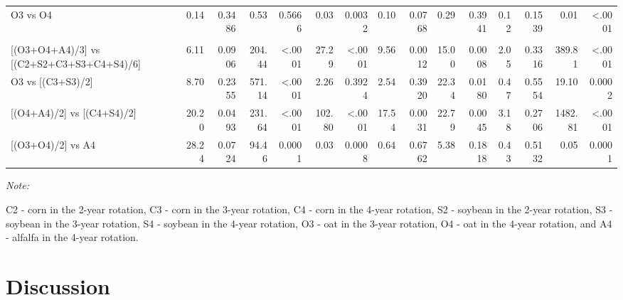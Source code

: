 \documentclass[
]{article}
\begin{document}
\begin{landscape}
\begin{table}
{\begin{threeparttable}
\begin{tabular}[t]{lr>{}r|r>{}r|r>{}r|r>{}r|r>{}r|r>{}r|rr}
\hspace{1em}\hspace{1em}O3 vs O4 & 0.14 & 0.3486 & 0.53 & 0.5666 & 0.03 & 0.0032 & 0.10 & 0.0768 & 0.29 & 0.3941 & 0.12 & 0.1539 & 0.01 & <.0001\\
\addlinespace[0.3em]
\multicolumn{15}{l}{\textbf{(B3) - Crop type effects}}\\
\hspace{1em}\hspace{1em}{}[(O3+O4+A4)/3] vs [(C2+S2+C3+S3+C4+S4)/6] & 6.11 & 0.0906 & 204.44 & <.0001 & 27.29 & <.0001 & 9.56 & 0.0012 & 15.00 & 0.0008 & 2.05 & 0.3316 & 389.81 & <.0001\\
\hspace{1em}\hspace{1em}O3 vs [(C3+S3)/2] & 8.70 & 0.2355 & 571.14 & <.0001 & 2.26 & 0.3924 & 2.54 & 0.3920 & 22.34 & 0.0180 & 0.47 & 0.5554 & 19.10 & 0.0002\\
\hspace{1em}\hspace{1em}{}[(O4+A4)/2] vs [(C4+S4)/2] & 20.20 & 0.0493 & 231.64 & <.0001 & 102.80 & <.0001 & 17.54 & 0.0031 & 22.79 & 0.0045 & 3.18 & 0.2706 & 1482.81 & <.0001\\
\hspace{1em}\hspace{1em}{}[(O3+O4)/2] vs A4 & 28.24 & 0.0724 & 94.46 & 0.0001 & 0.03 & 0.0008 & 0.64 & 0.6762 & 5.38 & 0.1818 & 0.43 & 0.5132 & 0.05 & 0.0001\\
\bottomrule
\end{tabular}
\begin{tablenotes}[para]
\item \textit{Note: } 
\item C2 - corn in the 2-year rotation, C3 - corn in the 3-year rotation, C4 - corn in the 4-year rotation, S2 - soybean in the 2-year rotation, S3 - soybean in the 3-year rotation, S4 - soybean in the 4-year rotation, O3 - oat in the 3-year rotation, O4 - oat in the 4-year rotation, and A4 - alfalfa in the 4-year rotation.
\end{tablenotes}
\end{threeparttable}}
\end{table}
\end{landscape}

\hypertarget{discussion}{%
\section*{Discussion}\label{discussion}}
\end{document}
